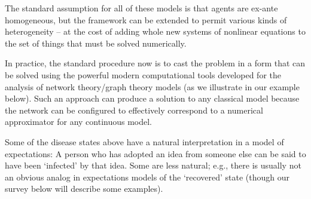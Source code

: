 
The standard assumption for all of these models is that agents are ex-ante homogeneous, but the framework can be extended to permit various kinds of heterogeneity -- at the cost of adding whole new systems of nonlinear equations to the set of things that must be solved numerically.

In practice, the standard procedure now is to cast the problem in a form that can be solved using the powerful modern computational tools developed for the analysis of network theory/graph theory models (as we illustrate in our example below).  Such an approach can produce a solution to any classical model because the network can be configured to effectively correspond to a numerical approximator for any continuous model.


Some of the disease states above have a natural interpretation in a model of expectations: A person who has adopted an idea from someone else can be said to have been `infected' by that idea.  Some are less natural; e.g., there is usually not an obvious analog in expectations models of the `recovered' state (though our survey below will describe some examples).



